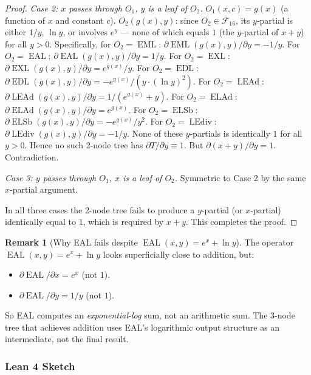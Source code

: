 \documentclass[12pt,a4paper]{article}
\theoremstyle{definition}
\newtheorem{remark}[theorem]{Remark}
\newcommand{\EML}{\operatorname{EML}}
\newcommand{\EDL}{\operatorname{EDL}}
\newcommand{\EXL}{\operatorname{EXL}}
\newcommand{\EAL}{\operatorname{EAL}}
\newcommand{\ELAd}{\operatorname{ELAd}}
\newcommand{\ELSb}{\operatorname{ELSb}}
\newcommand{\LEAd}{\operatorname{LEAd}}
\newcommand{\LEdiv}{\operatorname{LEdiv}}
\newcommand{\F}{\mathcal{F}_{16}}
\begin{document}
\begin{proof}
\noindent\textit{Case 2: $x$ passes through $O_1$, $y$ is a leaf of $O_2$.}
$O_1(x, c) = g(x)$ (a function of $x$ and constant $c$).
$O_2(g(x), y)$: since $O_2\in\F$, its $y$-partial is either $1/y$, $\ln y$,
or involves $e^y$ --- none of which equals $1$ (the $y$-partial of $x+y$)
for all $y>0$.
Specifically, for $O_2=\EML$: $\partial\EML(g(x),y)/\partial y = -1/y$.
For $O_2=\EAL$: $\partial\EAL(g(x),y)/\partial y = 1/y$.
For $O_2=\EXL$: $\partial\EXL(g(x),y)/\partial y = e^{g(x)}/y$.
For $O_2=\EDL$: $\partial\EDL(g(x),y)/\partial y = -e^{g(x)}/(y\cdot(\ln y)^2)$.
For $O_2=\LEAd$: $\partial\LEAd(g(x),y)/\partial y = 1/(e^{g(x)}+y)$.
For $O_2=\ELAd$: $\partial\ELAd(g(x),y)/\partial y = e^{g(x)}$.
For $O_2=\ELSb$: $\partial\ELSb(g(x),y)/\partial y = -e^{g(x)}/y^2$.
For $O_2=\LEdiv$: $\partial\LEdiv(g(x),y)/\partial y = -1/y$.
None of these $y$-partials is identically $1$ for all $y>0$.
Hence no such 2-node tree has $\partial T/\partial y \equiv 1$.
But $\partial(x+y)/\partial y = 1$.  Contradiction.

\noindent\textit{Case 3: $y$ passes through $O_1$, $x$ is a leaf of $O_2$.}
Symmetric to Case 2 by the same $x$-partial argument.

In all three cases the 2-node tree fails to produce a $y$-partial (or $x$-partial)
identically equal to $1$, which is required by $x+y$.  This completes the proof.
\end{proof}

\begin{remark}[Why EAL fails despite $\EAL(x,y)=e^x+\ln y$]\label{rem:EAL}
The operator $\EAL(x,y)=e^x+\ln y$ looks superficially close to addition, but:
\begin{itemize}
  \item $\partial\EAL/\partial x = e^x$ (not $1$).
  \item $\partial\EAL/\partial y = 1/y$ (not $1$).
\end{itemize}
So EAL computes an \emph{exponential-log} sum, not an arithmetic sum.
The 3-node tree that achieves addition uses EAL's logarithmic output structure
as an intermediate, not the final result.
\end{remark}

\subsubsection{Lean 4 Sketch}
\end{document}
